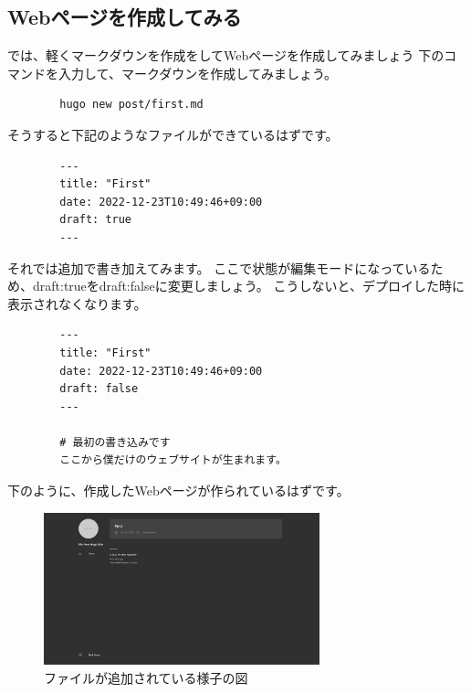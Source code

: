   \subsection{Webページを作成してみる}
    では、軽くマークダウンを作成をしてWebページを作成してみましょう
    下のコマンドを入力して、マークダウンを作成してみましょう。

    \begin{shaded}
      \begin{verbatim}
        hugo new post/first.md
      \end{verbatim}
    \end{shaded}

    そうすると下記のようなファイルができているはずです。
    
    \begin{tcolorbox}[breakable]
      \begin{verbatim}
        ---
        title: "First"
        date: 2022-12-23T10:49:46+09:00
        draft: true
        ---
      \end{verbatim}
    \end{tcolorbox}

    それでは追加で書き加えてみます。
    ここで状態が編集モードになっているため、draft:trueをdraft:falseに変更しましょう。
    こうしないと、デプロイした時に表示されなくなります。

    \begin{tcolorbox}[breakable]
      \begin{verbatim}
        ---
        title: "First"
        date: 2022-12-23T10:49:46+09:00
        draft: false
        ---

        # 最初の書き込みです
        ここから僕だけのウェブサイトが生まれます。
      \end{verbatim}
    \end{tcolorbox}

    下のように、作成したWebページが作られているはずです。

    \begin{figure}[H]
      \centering
      \includegraphics[width=8cm]{./image/02-chap5/add-file-list.png}
      \caption{ファイルが追加されている様子の図}
      \label{chap5-add-file-list-image}
    \end{figure}

